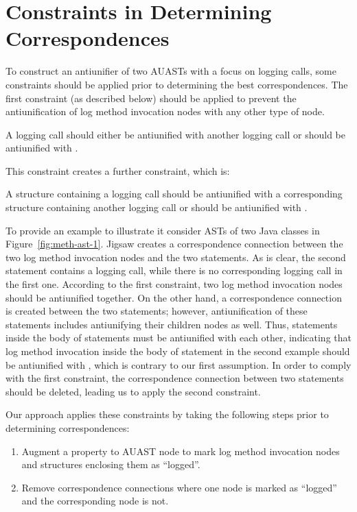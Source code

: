 \section{Constraints in Determining Correspondences}  \label{meth-constraints}
To construct an antiunifier of two AUASTs with a focus on logging calls, some constraints should be applied prior to determining the best correspondences. The first constraint (as described below) should be applied to prevent the antiunification of log method invocation nodes with any other type of node.
\begin{constraint}
A logging call should either be antiunified with another logging call or should be antiunified with \nothing.
\end{constraint}	
	
This constraint creates a further constraint, which is:

\begin{constraint}
A structure containing a logging call should be antiunified with a corresponding structure containing another logging call or should be antiunified with \nothing.
\end{constraint}


To provide an example to illustrate it consider ASTs of two Java classes in Figure~\ref{fig:meth-ast-1}. Jigsaw creates a correspondence connection between the two log method invocation nodes and the two  statements. As is clear, the second  statement contains a logging call, while there is no corresponding logging call in the first one. According to the first constraint, two log method invocation nodes should be antiunified together. On the other hand, a correspondence connection is created between the two  statements; however, antiunification of these statements includes antiunifying their children nodes as well. Thus, statements inside the body of  statements must be antiunified with each other, indicating that log method invocation inside the body of  statement in the second example should be antiunified with \nothing, which is contrary to our first assumption. In order to comply with the first constraint, the correspondence connection between two  statements should be deleted, leading us to apply the second constraint.

Our approach applies these constraints by taking the following steps prior to determining correspondences:
\begin{enumerate} [leftmargin=.4in]
\item	Augment a property to AUAST node to mark log method invocation nodes and structures enclosing them as ``logged''.

\item	Remove correspondence connections where one node is marked as ``logged'' and the corresponding node is not.
\end{enumerate}


